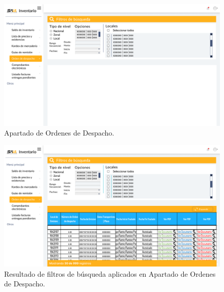 \documentclass{scrreprt}
\begin{document}
    \begin{figure}[!htpb]
        \centerline{\includegraphics[scale=.22]{images/prototype/web/Ordenes de despacho.png}}
        \caption{Apartado de Ordenes de Despacho.}
        \label{fig}
    \end{figure}
    \FloatBarrier
    \begin{figure}[!htpb]
        \centerline{\includegraphics[scale=.22]{images/prototype/web/Ordenes de despacho 2.png}}
        \caption{Resultado de filtros de búsqueda aplicados en Apartado de Ordenes de Despacho.}
        \label{fig}
    \end{figure}
    \FloatBarrier
\end{document}
